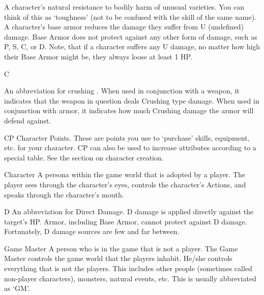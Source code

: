 \documentclass[twoside]{book}
\begin{document}
                  A character's natural resistance to bodily
                 harm of unusual varieties. You can think of this as
                 `toughness' (not to be confused with the
                 skill of the same name). A character's base armor
                 reduces the damage they suffer from U (undefined)
                 damage. Base Armor does not protect against any other
                 form of damage, such as P, S, C, or D. Note, that if a
                 character suffers any U damage, no matter how high their
                 Base Armor might be, they always loose at least 1 HP.
                 
              
              
              
                 C 
                
                An abbreviation for 
                  crushing  . When used in conjunction
                  with a weapon, it indicates that the weapon in question
                  deals Crushing type damage. When used in conjunction
                  with armor, it indicates how much Crushing damage the
                  armor will defend against.
                
              
              
               CP   
                  Character Points. These are points you use to
                 `purchase' skills, equipment, etc. for your
                 character. CP can also be used to increase attributes
                 according to a special table. See the section on
                 character creation. 
              
              
               Character   
                  A persona within the game world that is adopted
                 by a player. The player sees through the
                 character's eyes, controls the character's
                 Actions, and speaks through the character's mouth.
                 
              
              
               D   
                  An abbreviation for Direct Damage. D damage is
                 applied directly against the target's HP. Armor,
                 including Base Armor, cannot protect against D damage.
                 Fortunately, D damage sources are few and far between.
                 
              
              
               Game Master   
                  A person who is in the game that is not a player.
                 The Game Master controls the game world that the players
                 inhabit. He/she controls everything that is not the
                 players. This includes other people (sometimes called
                 non-player characters), monsters, natural events, etc.
                 This is usually abbreviated as `GM'. 
              
\end{document}
